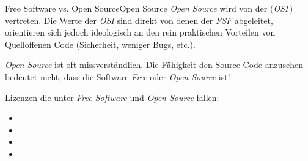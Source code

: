 \documentclass{setbeamer}
\begin{document}
\begin{frame}{Free Software vs. Open Source}{Open Source}
    \emph{Open Source} wird von der  (\emph{OSI}\,) vertreten. Die Werte der \emph{OSI} sind direkt von denen der \emph{FSF} abgeleitet, orientieren sich jedoch ideologisch an den rein praktischen Vorteilen von Quelloffenen Code (Sicherheit, weniger Bugs, etc.).

    \pause
    \vspace{0.3cm}

    \emph{Open Source} ist oft missverständlich. Die Fähigkeit den Source Code anzusehen bedeutet nicht, dass die Software \emph{Free} oder \emph{Open Source} ist!

    \pause
    \vspace{0.3cm}

    Lizenzen die unter \emph{Free Software} und \emph{Open Source} fallen:
    \begin{itemize}
        \item {}
        \item {}
        \item {}
        \item {}
    \end{itemize}

\end{frame}
\end{document}
